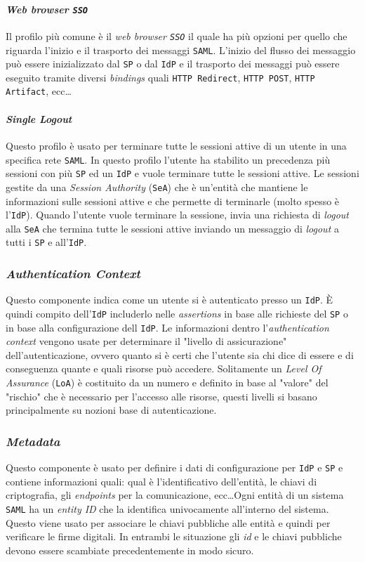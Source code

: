            \paragraph{\textit{Web browser \texttt{SSO}}} Il profilo più comune è il \textit{web browser \texttt{SSO}} il quale ha più opzioni per quello che riguarda l'inizio e il trasporto dei messaggi \texttt{SAML}. L'inizio del flusso dei messaggio può essere inizializzato dal \texttt{SP} o dal \texttt{IdP} e il trasporto dei messaggi può essere eseguito tramite diversi \textit{bindings} quali \texttt{HTTP Redirect}, \texttt{HTTP POST}, \texttt{HTTP Artifact}, ecc\dots
            \paragraph{\textit{Single Logout}} Questo profilo è usato per terminare tutte le sessioni attive di un utente in una specifica rete \texttt{SAML}. In questo profilo l'utente ha stabilito un precedenza più sessioni con più \texttt{SP} ed un \texttt{IdP} e vuole terminare tutte le sessioni attive. Le sessioni gestite da una \textit{Session Authority} (\texttt{SeA}) che è un'entità che mantiene le informazioni sulle sessioni attive e che permette di terminarle (molto spesso è l'\texttt{IdP}). Quando l'utente vuole terminare la sessione, invia una richiesta di \textit{logout} alla \texttt{SeA} che termina tutte le sessioni attive inviando un messaggio di \textit{logout} a tutti i \texttt{SP} e all'\texttt{IdP}.
        \subsubsection{\textit{Authentication Context}}
            Questo componente indica come un utente si è autenticato presso un \texttt{IdP}. È quindi compito dell'\texttt{IdP} includerlo nelle \textit{assertions} in base alle richieste del \texttt{SP} o in base alla configurazione dell \texttt{IdP}. Le informazioni dentro l'\textit{authentication context} vengono usate per determinare il "livello di assicurazione" dell'autenticazione, ovvero quanto si è certi che l'utente sia chi dice di essere e di conseguenza quante e quali risorse può accedere. Solitamente un \textit{Level Of Assurance} (\texttt{LoA}) è costituito da un numero e definito in base al "valore" del "rischio" che è necessario per l'accesso alle risorse, questi livelli si basano principalmente su nozioni base di autenticazione.
        \subsubsection{\textit{Metadata}}
            Questo componente è usato per definire i dati di configurazione per \texttt{IdP} e \texttt{SP} e contiene informazioni quali: qual è l'identificativo dell'entità, le chiavi di criptografia, gli \textit{endpoints} per la comunicazione, ecc\dots Ogni entità di un sistema \texttt{SAML} ha un \textit{entity ID} che la identifica univocamente all'interno del sistema. Questo viene usato per associare le chiavi pubbliche alle entità e quindi per verificare le firme digitali. In entrambi le situazione gli \textit{id} e le chiavi pubbliche devono essere scambiate precedentemente in modo sicuro.
        
